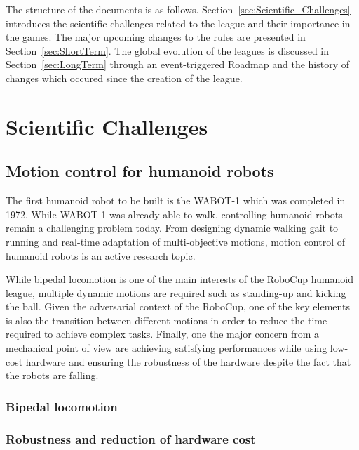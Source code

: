 \documentclass{article}
\begin{document}
The structure of the documents is as
follows. Section~\ref{sec:Scientific_Challenges} introduces the scientific
challenges related to the league and their importance in the games. The major
upcoming changes to the rules are presented in Section~\ref{sec:ShortTerm}. The
global evolution of the leagues is discussed in Section~\ref{sec:LongTerm}
through an event-triggered Roadmap and the history of changes which occured
since the creation of the league.

\section{\label{sec:Scientific_Challenges}Scientific Challenges}

\subsection{Motion control for humanoid robots}

The first humanoid robot to be built is the WABOT-1 which was completed in
1972. While WABOT-1 was already able to walk, controlling humanoid robots remain
a challenging problem today. From designing dynamic walking gait to running and
real-time adaptation of multi-objective motions, motion control of humanoid
robots is an active research topic.

While bipedal locomotion is one of the main interests of the RoboCup humanoid
league, multiple dynamic motions are required such as standing-up and kicking
the ball. Given the adversarial context of the RoboCup, one of the key elements
is also the transition between different motions in order to reduce the time
required to achieve complex tasks. Finally, one the major concern from a
mechanical point of view are achieving satisfying performances while using
low-cost hardware and ensuring the robustness of the hardware despite the fact
that the robots are falling.

\subsubsection{Bipedal locomotion}



\subsubsection{Robustness and reduction of hardware cost}
\end{document}
